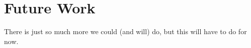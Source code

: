 \chapter{Future Work}

There is just so much more we could (and will) do, but this will have to do for
now.
